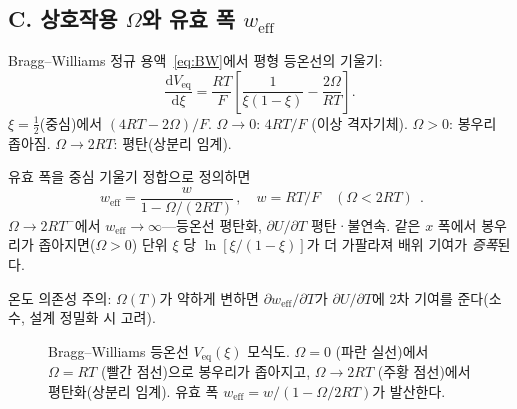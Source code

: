 \documentclass[11pt,a4paper]{article}
\newcommand{\dd}{\mathrm{d}}
\newcommand{\eq}{\mathrm{eq}}
\newcommand{\eff}{\mathrm{eff}}
\begin{document}
\subsection{C. 상호작용 $\Omega$와 유효 폭 $w_{\eff}$}\label{sec:mixing_C}

Bragg--Williams 정규 용액~\eqref{eq:BW}에서 평형 등온선의 기울기:
\begin{equation}
  \frac{\dd V_{\eq}}{\dd\xi}=\frac{RT}{F}\!\left[\frac{1}{\xi(1-\xi)}-\frac{2\Omega}{RT}\right].
  \label{eq:isotherm_slope}
\end{equation}
$\xi=\frac{1}{2}$(중심)에서 $(4RT-2\Omega)/F$.
$\Omega\to0$: $4RT/F$ (이상 격자기체). $\Omega>0$: 봉우리 좁아짐. $\Omega\to2RT$: 평탄(상분리 임계).

유효 폭을 중심 기울기 정합으로 정의하면
\begin{equation}
  \boxed{\;w_{\eff}=\frac{w}{1-\Omega/(2RT)}\,,\quad w=RT/F\quad(\Omega<2RT)\;}\,.
  \label{eq:weff}
\end{equation}
$\Omega\to2RT^-$에서 $w_{\eff}\to\infty$---등온선 평탄화, $\partial U/\partial T$ 평탄·불연속.
같은 $x$ 폭에서 봉우리가 좁아지면($\Omega>0$) 단위 $\xi$ 당 $\ln[\xi/(1-\xi)]$가 더 가팔라져
배위 기여가 \emph{증폭}된다.

온도 의존성 주의: $\Omega(T)$가 약하게 변하면 $\partial w_{\eff}/\partial T$가
$\partial U/\partial T$에 2차 기여를 준다(소수, 설계 정밀화 시 고려).

\begin{figure}[h]
\centering
\caption{Bragg--Williams 등온선 $V_{\eq}(\xi)$ 모식도.
$\Omega=0$ (파란 실선)에서 $\Omega=RT$ (빨간 점선)으로 봉우리가 좁아지고,
$\Omega\to2RT$ (주황 점선)에서 평탄화(상분리 임계).
유효 폭 $w_{\eff}=w/(1-\Omega/2RT)$가 발산한다.}
\label{fig:weff}
\end{figure}
\end{document}
